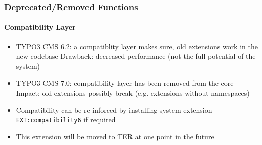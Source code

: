 %

\begin{frame}[fragile]
	\frametitle{Deprecated/Removed Functions}
	\framesubtitle{Compatibility Layer}

	\begin{itemize}

		\item TYPO3 CMS 6.2: a compatiblity layer makes sure, old extensions work in the new codebase\newline
			\small
				Drawback: decreased performance (not the full potential of the system)
			\normalsize

		\item TYPO3 CMS 7.0: compatibility layer has been removed from the core\newline
			\small
				Impact: old extensions possibly break (e.g. extensions without namespaces)
			\normalsize

		\item Compatibility can be re-inforced by installing system extension \texttt{EXT:compatibility6} if required
		\item This extension will be moved to TER at one point in the future

	\end{itemize}

\end{frame}


